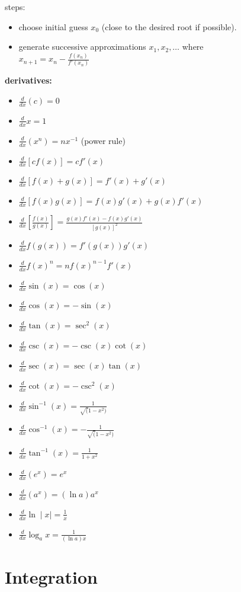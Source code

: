 \documentclass{article}
\begin{document}
steps:
	\begin{itemize}
		\item choose initial guess $x_0$ (close to the desired root if possible).
		\item generate successive approximations $x_1, x_2, \ldots$ where\\ $x_{n + 1} = x_n - \frac{f(x_n)}{f'(x_n)}$
	\end{itemize}

\textbf{derivatives:}
	\begin{itemize}
		\item $\frac{d}{dx}(c) = 0$
		\item $\frac{d}{dx}x = 1$
		\item $\frac{d}{dx}(x^n) = nx^{-1}$ (power rule)
		\item $\frac{d}{dx}[cf(x)] = cf'(x)$
		\item $\frac{d}{dx}[f(x)+g(x)] = f'(x) + g'(x)$
		\item $\frac{d}{dx}[f(x)g(x)] = f(x)g'(x) + g(x)f'(x)$
		\item $\frac{d}{dx}[\frac{f(x)}{g(x)}] = \frac{g(x)f'(x) - f(x)g'(x)}{[g(x)]^2}$
		\item $\frac{d}{dx}f(g(x)) = f'(g(x))g'(x)$
		\item $\frac{d}{dx}f(x)^n = nf(x)^{n-1}f'(x)$
		\item $\frac{d}{dx}\sin(x) = \cos(x)$
		\item $\frac{d}{dx}\cos(x) = -\sin(x)$
		\item $\frac{d}{dx}\tan(x) = \sec^2(x)$
		\item $\frac{d}{dx}\csc(x) = -\csc(x)\cot(x)$
		\item $\frac{d}{dx}\sec(x) = \sec(x)\tan(x)$
		\item $\frac{d}{dx}\cot(x) = -\csc^2(x)$
		\item $\frac{d}{dx}\sin^{-1}(x) = \frac{1}{\sqrt(1 - x^2)}$
		\item $\frac{d}{dx}\cos^{-1}(x) = -\frac{1}{\sqrt(1 - x^2)}$
		\item $\frac{d}{dx}\tan^{-1}(x) = \frac{1}{1 + x^2}$
		\item $\frac{d}{dx}(e^x) = e^x$
		\item $\frac{d}{dx}(a^x) = (\ln a)a^x$
		\item $\frac{d}{dx}\ln\mid x\mid = \frac{1}{x}$
		\item $\frac{d}{dx}\log_ax = \frac{1}{(\ln a)x}$
	\end{itemize}

\section*{Integration}
\end{document}
